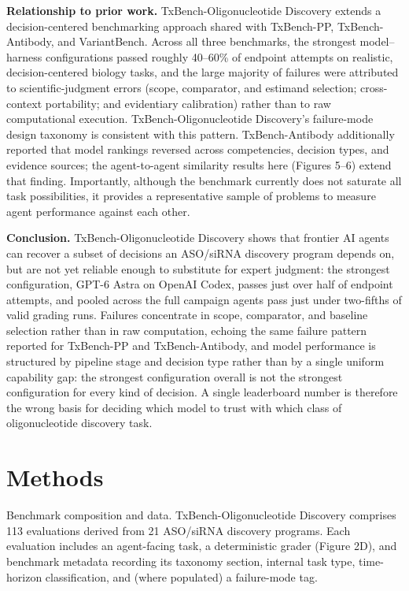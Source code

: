 \documentclass[11pt]{article}
\begin{document}
\textbf{Relationship to prior work.} TxBench-Oligonucleotide Discovery extends a decision-centered benchmarking approach shared with TxBench-PP, TxBench-Antibody, and VariantBench. Across all three benchmarks, the strongest model--harness configurations passed roughly 40--60\% of endpoint attempts on realistic, decision-centered biology tasks, and the large majority of failures were attributed to scientific-judgment errors (scope, comparator, and estimand selection; cross-context portability; and evidentiary calibration) rather than to raw computational execution. TxBench-Oligonucleotide Discovery's failure-mode design taxonomy is consistent with this pattern. TxBench-Antibody additionally reported that model rankings reversed across competencies, decision types, and evidence sources; the agent-to-agent similarity results here (Figures 5--6) extend that finding. Importantly, although the benchmark currently does not saturate all task possibilities, it provides a representative sample of problems to measure agent performance against each other. 


\textbf{Conclusion.} TxBench-Oligonucleotide Discovery shows that frontier AI agents can recover a subset of decisions an ASO/siRNA discovery program depends on, but are not yet reliable enough to substitute for expert judgment: the strongest configuration, GPT-6 Astra on OpenAI Codex, passes just over half of endpoint attempts, and pooled across the full campaign agents pass just under two-fifths of valid grading runs. Failures concentrate in scope, comparator, and baseline selection rather than in raw computation, echoing the same failure pattern reported for TxBench-PP and TxBench-Antibody, and model performance is structured by pipeline stage and decision type rather than by a single uniform capability gap: the strongest configuration overall is not the strongest configuration for every kind of decision. A single leaderboard number is therefore the wrong basis for deciding which model to trust with which class of oligonucleotide discovery task.

\section{Methods}
Benchmark composition and data. TxBench-Oligonucleotide Discovery comprises 113 evaluations derived from 21 ASO/siRNA discovery programs. Each evaluation includes an agent-facing task, a deterministic grader (Figure 2D), and benchmark metadata recording its taxonomy section, internal task type, time-horizon classification, and (where populated) a failure-mode tag.
\end{document}
